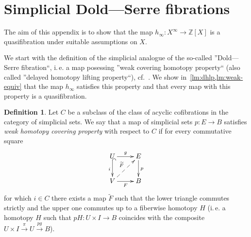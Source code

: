 \documentclass[oneside, 10pt]{amsart}
\theoremstyle{plain}
\numberwithin{equation}{section}
\numberwithin{lemma}{section}
\theoremstyle{remark}
\theoremstyle{definition}
\newtheorem{df}[lemma]{Definition} \Crefname{df}{Definition}{Definitions}
\newcommand{\ZZ}{\mathbb{Z}}
\begin{document}
\appendix\section{Simplicial Dold---Serre fibrations}
The aim of this appendix is to show that the map $h_\infty\colon X^{\infty}\to \ZZ[X]$ is a quasifibration under suitable assumptions on $X$.

We start with the definition of the simplicial analogue of the so-called ''Dold---Serre fibration``, i.\,e.
a map posessing ''weak covering homotopy property`` (also called ''delayed homotopy lifting property``), cf.~\cite[\S~1.4.4]{KSz14}.
We show in~\cref{lm:dhlp,lm:weak-equiv} that the map $h_\infty$ satisfies this property and that every map with this property is a quasifibration.
 
\begin{df} \label{df:dhlp}
 Let $C$ be a subclass of the class of acyclic cofibrations in the category of simplicial sets.
 We say that a map of simplicial sets $p\colon E \to B$ satisfies {\it weak homotopy covering property} with respect to $C$ if 
  for every commutative square
\begin{equation} \xymatrix{ 
U \ar[r]^{g}  \ar@{^{(}->}_{i}[d] & E \ar^{p}[d] \\
V \ar[r]_{F} \ar@{-->}[ru]^{\widetilde{F}} & B}
\label{eq:plp-def} \end{equation}
for which $i \in C$ there exists a map $\widetilde{F}$ such that the lower triangle commutes strictly and the upper one commutes up to a fiberwise homotopy $H$
 (i.\,e. a homotopy $H$ such that $pH \colon U \times I \to B$ coincides with the composite $U \times I \xrightarrow{\pi} U \xrightarrow{pg} B$).
\end{df}
\end{document}
